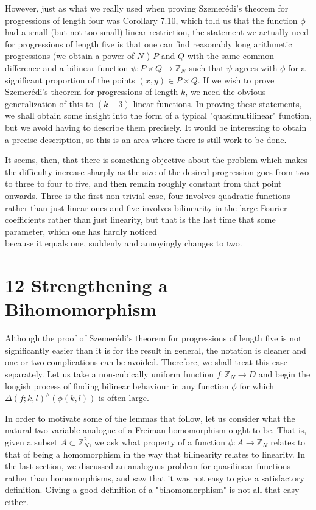 \documentclass[10pt]{article}
\begin{document}
However, just as what we really used when proving Szemerédi's theorem for progressions of length four was Corollary 7.10, which told us that the function $\phi$ had a small (but not too small) linear restriction, the statement we actually need for progressions of length five is that one can find reasonably long arithmetic progressions (we obtain a power of $N$ ) $P$ and $Q$ with the same common difference and a bilinear function $\psi: P \times Q \rightarrow \mathbb{Z}_{N}$ such that $\psi$ agrees with $\phi$ for a significant proportion of the points $(x, y) \in P \times Q$. If we wish to prove Szemerédi's theorem for progressions of length $k$, we need the obvious generalization of this to $(k-3)$-linear functions. In proving these statements, we shall obtain some insight into the form of a typical "quasimultilinear" function, but we avoid having to describe them precisely. It would be interesting to obtain a precise description, so this is an area where there is still work to be done.

It seems, then, that there is something objective about the problem which makes the difficulty increase sharply as the size of the desired progression goes from two to three to four to five, and then remain roughly constant from that point onwards. Three is the first non-trivial case, four involves quadratic functions rather than just linear ones and five involves bilinearity in the large Fourier coefficients rather than just linearity, but that is the last time that some parameter, which one has hardly noticed\\
because it equals one, suddenly and annoyingly changes to two.

\section*{12 Strengthening a Bihomomorphism}
Although the proof of Szemerédi's theorem for progressions of length five is not significantly easier than it is for the result in general, the notation is cleaner and one or two complications can be avoided. Therefore, we shall treat this case separately. Let us take a non-cubically uniform function $f: \mathbb{Z}_{N} \rightarrow D$ and begin the longish process of finding bilinear behaviour in any function $\phi$ for which $\Delta(f ; k, l)^{\wedge}(\phi(k, l))$ is often large.

In order to motivate some of the lemmas that follow, let us consider what the natural two-variable analogue of a Freiman homomorphism ought to be. That is, given a subset $A \subset \mathbb{Z}_{N}^{2}$, we ask what property of a function $\phi: A \rightarrow \mathbb{Z}_{N}$ relates to that of being a homomorphism in the way that bilinearity relates to linearity. In the last section, we discussed an analogous problem for quasilinear functions rather than homomorphisms, and saw that it was not easy to give a satisfactory definition. Giving a good definition of a "bihomomorphism" is not all that easy either.
\end{document}

